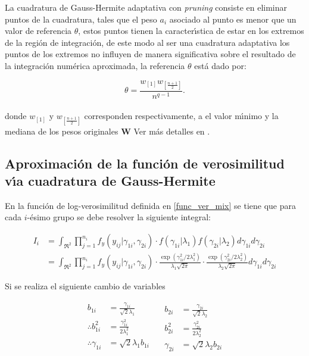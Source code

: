 La cuadratura de Gauss-Hermite adaptativa con \textit{pruning} consiste en eliminar puntos de la cuadratura, tales que el peso $a_i$ asociado al punto es menor que un valor de referencia $\theta$, estos puntos tienen la caracter\'{\i}stica de estar en los extremos de la regi\'{o}n de integraci\'{o}n, de este modo al ser una cuadratura adaptativa los puntos de los extremos no influyen de manera significativa sobre el resultado de la integraci\'{o}n num\'{e}rica aproximada, la referencia $\theta$ est\'{a} dado por:

\[
\theta=\frac{w_{[1]}w_{[\frac{n+1}{2}]}}{n^{q-1}}.
\]
\\
donde $w_{[1]}$ y $w_{[\frac{n+1}{2}]}$ corresponden respectivamente, a el valor m\'{\i}nimo y la mediana de los pesos originales \textbf{W} Ver m\'{a}s detalles en \cite{Hernandez1}.


\subsection{Aproximaci\'{o}n de la funci\'{o}n de verosimilitud v\'{\i}a cuadratura de Gauss-Hermite}

En la funci\'{o}n de log-verosimilitud definida en \eqref{func_ver_mix} se tiene que para cada $i$-\'{e}simo grupo se debe resolver la siguiente integral:

\begin{align*}
I_i &= \int_{\Re^2}{\prod_{j=1}^{n_i}f_y(y_{ij}|\gamma_{1i},\gamma_{2i})\cdot f(\gamma_{1i}|\lambda_1) f(\gamma_{2i}|\lambda_2) d\gamma_{1i}d\gamma_{2i}}\\
&=\int_{\Re^2}{\prod_{j=1}^{n_i}f_y(y_{ij}|\gamma_{1i},\gamma_{2i})\cdot \frac{\exp({\gamma_{1i}^2}/{2\lambda_1^2})}{\lambda_1\sqrt{2\pi}} \cdot \frac{\exp({\gamma_{2i}^2}/{2\lambda_2^2})}{\lambda_2\sqrt{2\pi}} d\gamma_{1i}d\gamma_{2i}}
\end{align*}

Si se realiza el siguiente cambio de variables

\begin{equation*}
\begin{aligned}
b_{1i}&=\frac{\gamma_{1i}}{\sqrt{2}\lambda_1}\\
\therefore b_{1i}^2&=\frac{\gamma_{1i}^2}{2\lambda_1^2}\\
\therefore \gamma_{1i}&=\sqrt{2}\lambda_1b_{1i}\\
\end{aligned}
\quad
\begin{aligned}
b_{2i}&=\frac{\gamma_{2i}}{\sqrt{2}\lambda_2}\\
b_{2i}^2&=\frac{\gamma_{2i}^2}{2\lambda_2^2}\\
\gamma_{2i}&=\sqrt{2}\lambda_2 b_{2i}
\end{aligned}
\end{equation*}

